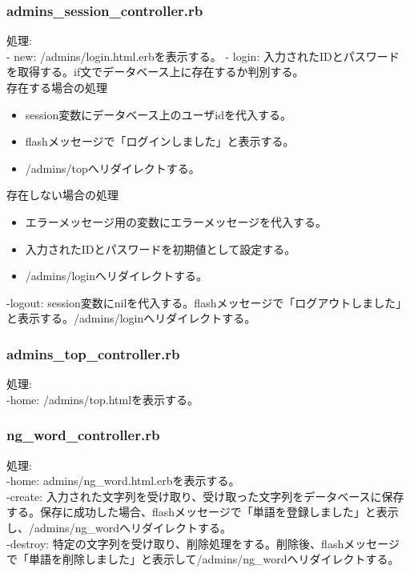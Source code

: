 \documentclass[a4j]{jarticle}
\begin{document}
\subsubsection{admins\_session\_controller.rb}
\noindent
処理:  \\
- new: /admins/login.html.erbを表示する。
- login: 入力されたIDとパスワードを取得する。if文でデータベース上に存在するか判別する。\\
存在する場合の処理\\
\begin{itemize}
\item session変数にデータベース上のユーザidを代入する。
\item flashメッセージで「ログインしました」と表示する。
\item /admins/topへリダイレクトする。\\
\end{itemize}
存在しない場合の処理\\
\begin{itemize}
\item エラーメッセージ用の変数にエラーメッセージを代入する。
\item 入力されたIDとパスワードを初期値として設定する。
\item /admins/loginへリダイレクトする。\\
\end{itemize}
-logout: session変数にnilを代入する。flashメッセージで「ログアウトしました」と表示する。/admins/loginへリダイレクトする。

\subsubsection{admins\_top\_controller.rb}
\noindent
処理:  \\
-home: /admins/top.htmlを表示する。

\subsubsection{ng\_word\_controller.rb}
\noindent
処理:  \\
-home: admins/ng\_word.html.erbを表示する。\\
-create: 入力された文字列を受け取り、受け取った文字列をデータベースに保存する。保存に成功した場合、flashメッセージで「単語を登録しました」と表示し、/admins/ng\_wordへリダイレクトする。\\
-destroy: 特定の文字列を受け取り、削除処理をする。削除後、flashメッセージで「単語を削除しました」と表示して/admins/ng\_wordへリダイレクトする。
\end{document}
